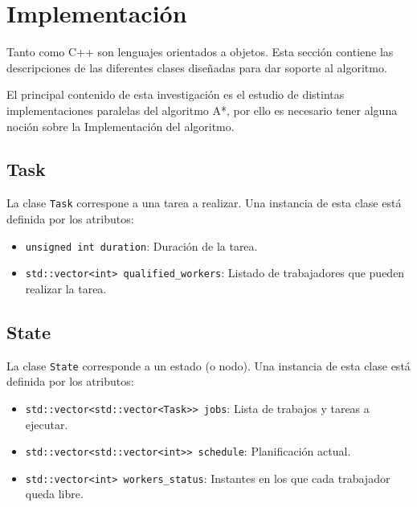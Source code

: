
\section{Implementación}

Tanto \Python como C++ son lenguajes orientados a objetos.
Esta sección contiene las descripciones de las diferentes
clases diseñadas para dar soporte al algoritmo.

\begin{notebox}
El principal contenido de esta investigación es el estudio
de distintas implementaciones paralelas del algoritmo A*,
por ello es necesario tener alguna noción sobre la Implementación
del algoritmo.
\end{notebox}

\subsection{Task}

La clase \lstinline{Task} correspone a una tarea a realizar.
Una instancia de esta clase está definida por los atributos:
\begin{itemize}[itemsep=0.25px]
    \item \lstinline{unsigned int duration}: Duración de la tarea.
    \item \lstinline{std::vector<int> qualified_workers}: Listado de trabajadores que pueden realizar la tarea.
\end{itemize}

\subsection{State}

La clase \lstinline{State} corresponde a un estado (o nodo).
Una instancia de esta clase está definida por los atributos:
\begin{itemize}[itemsep=0.25px]
    \item \lstinline{std::vector<std::vector<Task>> jobs}: Lista de trabajos y tareas a ejecutar.
    \item \lstinline{std::vector<std::vector<int>> schedule}: Planificación actual.
    \item \lstinline{std::vector<int> workers_status}: Instantes en los que cada trabajador queda libre.
\end{itemize}

